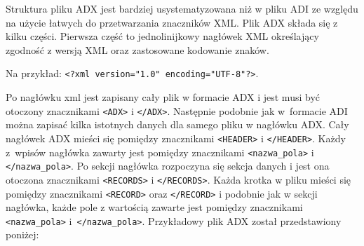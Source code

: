 \documentclass[]{mgr}
\begin{document}
            Struktura pliku ADX jest bardziej usystematyzowana niż w pliku ADI ze względu na użycie łatwych do przetwarzania znaczników XML. Plik ADX składa się z kilku części. Pierwsza część to jednolinijkowy nagłówek XML określający zgodność z wersją XML oraz zastosowane kodowanie znaków.

            \noindent Na przykład: \texttt{<?xml version="1.0" encoding="UTF-8"?>}.

            \noindent Po nagłówku xml jest zapisany cały plik w formacie ADX i jest musi być otoczony znacznikami \texttt{<ADX>} i \texttt{</ADX>}. Następnie podobnie jak w~formacie ADI można zapisać kilka istotnych danych dla samego pliku w nagłówku ADX. Cały nagłówek ADX mieści się pomiędzy znacznikami \texttt{<HEADER>} i \texttt{</HEADER>}. Każdy z~wpisów nagłówka zawarty jest pomiędzy znacznikami \texttt{<nazwa\_pola>} i \texttt{</nazwa\_pola>}. Po sekcji nagłówka rozpoczyna się sekcja danych i jest ona otoczona znacznikami \texttt{<RECORDS>} i \texttt{</RECORDS>}. Każda krotka w pliku mieści się pomiędzy znacznikami \texttt{<RECORD>} oraz \texttt{</RECORD>} i podobnie jak w sekcji nagłówka, każde pole z wartością zawarte jest pomiędzy znacznikami \texttt{<nazwa\_pola>} i~\texttt{</nazwa\_pola>}. Przykładowy plik ADX został przedstawiony poniżej:

            
\end{document}
